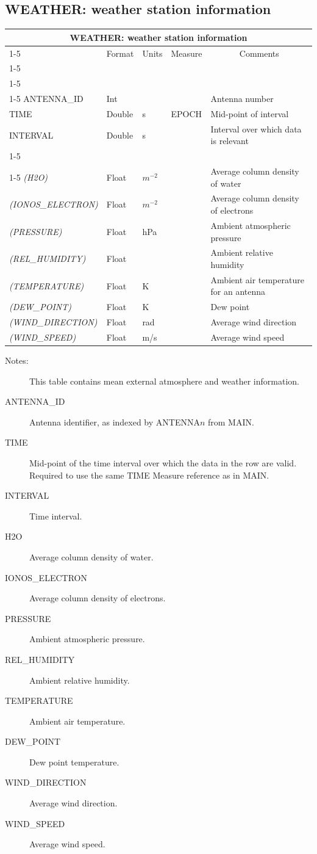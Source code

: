 \documentclass{article}
\newcommand{\defline}[1]{\cline{1-5}
\multicolumn{5}{|l|}{#1} \\
\cline{1-5}}
\newcommand{\definetable}[2]
{
	\vfill\newpage
	\subsection{#1}
        \vspace{0.15in}
        \small
	\begin{tabular}{|l|p{1.25in}|l|p{.9in}|p{1.4in}|}
	\hline
	\multicolumn{5}{|c|}{\bf #1}\\ 
	\cline{1-5}
        \multicolumn{1}{|c|}{Name}&\multicolumn{1}{|c|}{Format}&
        \multicolumn{1}{|c|}{Units}&\multicolumn{1}{|c|}{Measure}&
        \multicolumn{1}{|c|}{Comments}\\
        \cline{1-5}
        #2
        \hline
	\end{tabular}
}
\begin{document}
\definetable{WEATHER: weather station information}{
\defline{\bf Columns}
\defline{\em Key}
ANTENNA\_ID &        Int &    &      & Antenna number\\
TIME &  Double  &   s  & EPOCH  & Mid-point of interval\\ 
INTERVAL &       Double &        s  &      & Interval over which data is relevant\\
\defline{\em Data}  
{\it (H2O)} &        Float    &     $m^{-2}$  &      & Average column density of water\\
{\it (IONOS\_ELECTRON)} & Float & $m^{-2}$    &      & Average column density of electrons\\
{\it (PRESSURE)} &       Float & hPa  &      & Ambient atmospheric pressure\\
{\it (REL\_HUMIDITY)} &   Float &    &      & Ambient relative humidity\\
{\it (TEMPERATURE)} &    Float &  K  &     & Ambient air temperature for an antenna\\
{\it (DEW\_POINT)} & Float & K & & Dew point \\
{\it (WIND\_DIRECTION)} & Float  &       rad &      & Average wind direction\\
{\it (WIND\_SPEED)} &  Float &  m/s  &    & Average wind speed \\
}
\begin{description}

\item[Notes:] This table contains mean external atmosphere and weather
information.

\item[ANTENNA\_ID] Antenna identifier, as indexed by ANTENNA$n$ from MAIN.

\item[TIME] Mid-point of the time interval over which the data in the
row are valid. Required to use the same TIME Measure reference as in
MAIN.

\item[INTERVAL] Time interval.

\item[H2O] Average column density of water.

\item[IONOS\_ELECTRON] Average column density of electrons.

\item[PRESSURE] Ambient atmospheric pressure.

\item[REL\_HUMIDITY] Ambient relative humidity.

\item[TEMPERATURE] Ambient air temperature.

\item[DEW\_POINT] Dew point temperature.

\item[WIND\_DIRECTION] Average wind direction.

\item[WIND\_SPEED] Average wind speed.

\end{description}
\end{document}
